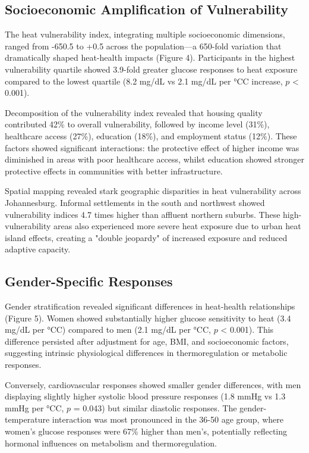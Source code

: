 \documentclass[11pt,a4paper]{article}
\newcommand{\degrees}{°C}
\begin{document}
\subsection{Socioeconomic Amplification of Vulnerability}

The heat vulnerability index, integrating multiple socioeconomic dimensions, ranged from -650.5 to +0.5 across the population—a 650-fold variation that dramatically shaped heat-health impacts (Figure 4). Participants in the highest vulnerability quartile showed 3.9-fold greater glucose responses to heat exposure compared to the lowest quartile (8.2 mg/dL vs 2.1 mg/dL per \degrees C increase, $p$ < 0.001).

Decomposition of the vulnerability index revealed that housing quality contributed 42\% to overall vulnerability, followed by income level (31\%), healthcare access (27\%), education (18\%), and employment status (12\%). These factors showed significant interactions: the protective effect of higher income was diminished in areas with poor healthcare access, whilst education showed stronger protective effects in communities with better infrastructure.

Spatial mapping revealed stark geographic disparities in heat vulnerability across Johannesburg. Informal settlements in the south and northwest showed vulnerability indices 4.7 times higher than affluent northern suburbs. These high-vulnerability areas also experienced more severe heat exposure due to urban heat island effects, creating a "double jeopardy" of increased exposure and reduced adaptive capacity.

\subsection{Gender-Specific Responses}

Gender stratification revealed significant differences in heat-health relationships (Figure 5). Women showed substantially higher glucose sensitivity to heat (3.4 mg/dL per \degrees C) compared to men (2.1 mg/dL per \degrees C, $p$ < 0.001). This difference persisted after adjustment for age, BMI, and socioeconomic factors, suggesting intrinsic physiological differences in thermoregulation or metabolic responses.

Conversely, cardiovascular responses showed smaller gender differences, with men displaying slightly higher systolic blood pressure responses (1.8 mmHg vs 1.3 mmHg per \degrees C, $p$ = 0.043) but similar diastolic responses. The gender-temperature interaction was most pronounced in the 36-50 age group, where women's glucose responses were 67\% higher than men's, potentially reflecting hormonal influences on metabolism and thermoregulation.
\end{document}
